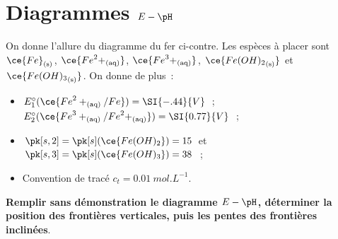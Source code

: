 \documentclass[a4paper, 10pt, final, garamond]{book}
\begin{document}
\setcounter{chapter}{23}


\chapter{Diagrammes $E-\pH$}

\begin{enumerate}[label=\sqenumi]
	\noindent
	\begin{minipage}[t]{.65\linewidth}
		On donne l'allure du diagramme du fer ci-contre. Les espèces à placer sont
		$\ce{Fe}_{\rm(s)}$, $\ce{{Fe}^2+_{\rm(aq)}}$, $\ce{{Fe}^3+_{\rm(aq)}}$,
		$\ce{{Fe(OH)_2}_{\rm(s)}}$ et $\ce{{Fe(OH)_3}_{\rm(s)}}$. On donne de plus~:
		\begin{itemize}
			\item $E_1^\circ(\ce{{Fe}^2+_{\rm(aq)}/Fe}) = \SI{-.44}{V}$~;
			      $E_2^\circ(\ce{{Fe}^3+_{\rm(aq)}/{Fe}^2+_{\rm(aq)}}) =
				      \SI{0.77}{V}$~;
			\item $\pk[s,2] = \pk[s](\ce{Fe(OH)_2}) = 15$ et $\pk[s,3] =
				      \pk[s](\ce{Fe(OH)_3}) = 38$~;
			\item Convention de tracé $c_t = \SI{0.01}{mol.L^{-1}}$.
		\end{itemize}
		\textbf{Remplir sans démonstration le diagramme $E-\pH$, déterminer la
			position des frontières verticales, puis les pentes des frontières
			inclinées}.
	\end{minipage}
	\hfill
	\begin{minipage}[t]{.32\linewidth}
		\vspace{-20pt}
		\begin{center}
\end{center}
\end{minipage}
\end{enumerate}
\end{document}
